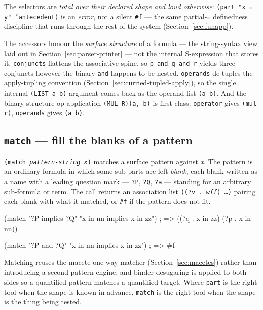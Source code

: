 \noindent
The selectors are \emph{total over their declared shape and loud
otherwise}: \texttt{(part "x = y" 'antecedent)} is an \emph{error}, not a
silent \texttt{\#f} --- the same partial-\texttt{=} definedness discipline
that runs through the rest of the system (Section~\ref{sec:funapp}).

\begin{remark}
The accessors honour the \emph{surface structure} of a formula --- the
string-syntax view laid out in Section~\ref{sec:parser-printer} --- not the
internal S-expression that stores it.  \texttt{conjuncts} flattens the
associative spine, so \texttt{p and q and r} yields three conjuncts however
the binary \texttt{and} happens to be nested.  \texttt{operands} de-tuples the apply-tupling convention
(Section~\ref{sec:curried-tupled-apply}), so the single internal
\texttt{(LIST a b)} argument comes back as the operand list
\texttt{(a~b)}.  And the binary structure-op application \texttt{(MUL
R)(a, b)} is first-class: \texttt{operator} gives \texttt{(mul r)},
\texttt{operands} gives \texttt{(a b)}.
\end{remark}

\subsection{\texttt{match} --- fill the blanks of a pattern}

\texttt{(match \textit{pattern-string} \textit{x})} matches a surface
pattern against \textit{x}.  The pattern is an ordinary formula in which
some sub-parts are left \emph{blank}, each blank written as a name with a
leading question mark --- \texttt{?P}, \texttt{?Q}, \texttt{?a} --- standing
for an arbitrary sub-formula or term.  The call returns an association list
\texttt{((?v\ .\ \textit{wff})\ \ldots)} pairing each blank with what it
matched, or \texttt{\#f} if the pattern does not fit.

\begin{VNBsnip}
(match "?P implies ?Q" "x in nn implies x in zz")
; => ((?q . x in zz) (?p . x in nn))

(match "?P and ?Q" "x in nn implies x in zz")
; => #f
\end{VNBsnip}

\noindent
Matching reuses the macete one-way matcher
(Section~\ref{sec:macetes}) rather than introducing a second pattern
engine, and binder desugaring is applied to both sides so a quantified
pattern matches a quantified target.  Where \texttt{part} is the right tool
when the shape is known in advance, \texttt{match} is the right tool when
the shape is the thing being tested.


